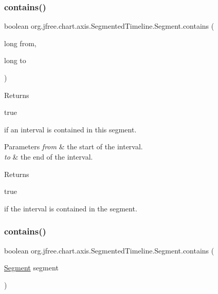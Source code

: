 \subsubsection{\texorpdfstring{contains()}{contains()}\hspace{0.1cm}{\footnotesize\ttfamily [2/3]}}
{\footnotesize\ttfamily boolean org.\+jfree.\+chart.\+axis.\+Segmented\+Timeline.\+Segment.\+contains (\begin{DoxyParamCaption}\item[{long}]{from,  }\item[{long}]{to }\end{DoxyParamCaption})}

Returns
\begin{DoxyCode}
\textcolor{keyword}{true} 
\end{DoxyCode}
 if an interval is contained in this segment.


\begin{DoxyParams}{Parameters}
{\em from} & the start of the interval. \\
\hline
{\em to} & the end of the interval.\\
\hline
\end{DoxyParams}
\begin{DoxyReturn}{Returns}

\begin{DoxyCode}
\textcolor{keyword}{true} 
\end{DoxyCode}
 if the interval is contained in the segment. 
\end{DoxyReturn}
\mbox{\label{classorg_1_1jfree_1_1chart_1_1axis_1_1_segmented_timeline_1_1_segment_aa136f581b0af583787d085be40554849}} 
\subsubsection{\texorpdfstring{contains()}{contains()}\hspace{0.1cm}{\footnotesize\ttfamily [3/3]}}
{\footnotesize\ttfamily boolean org.\+jfree.\+chart.\+axis.\+Segmented\+Timeline.\+Segment.\+contains (\begin{DoxyParamCaption}\item[{\mbox{\hyperlink{classorg_1_1jfree_1_1chart_1_1axis_1_1_segmented_timeline_1_1_segment}{Segment}}}]{segment }\end{DoxyParamCaption})}

